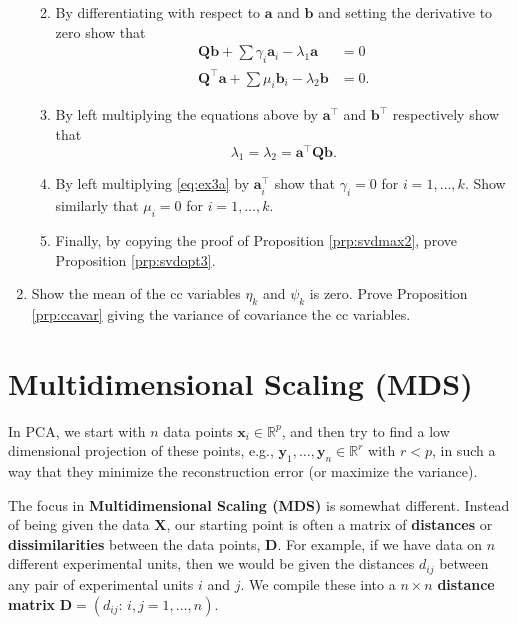 \documentclass[]{book}
\theoremstyle{definition}
\theoremstyle{definition}
\theoremstyle{definition}
\theoremstyle{remark}
\begin{document}
\begin{enumerate}
  \begin{enumerate}
  \def\labelenumii{\roman{enumii}.}
  \item
    By differentiating with respect to \(\mathbf a\) and \(\mathbf b\) and setting the derivative to zero show that
    \begin{align}
     \mathbf Q\mathbf b+ \sum\gamma_i \mathbf a_i - \lambda_1 \mathbf a&= 0 \label{eq:ex3a}\\
     \mathbf Q^\top\mathbf a+ \sum\mu_i \mathbf b_i - \lambda_2 \mathbf b&= 0. \label{eq:ex3b} 
     \end{align}
  \item
    By left multiplying the equations above by \(\mathbf a^\top\) and \(\mathbf b^\top\) respectively show that
    \[\lambda_1=\lambda_2 = \mathbf a^\top \mathbf Q\mathbf b.\]
  \item
    By left multiplying \eqref{eq:ex3a} by \(\mathbf a_i^\top\) show that \(\gamma_i=0\) for \(i=1, \ldots, k\). Show similarly that \(\mu_i =0\) for \(i=1, \ldots, k\).
  \item
    Finally, by copying the proof of Proposition \ref{prp:svdmax2}, prove Proposition \ref{prp:svdopt3}.
  \end{enumerate}
\item
  Show the mean of the cc variables \(\eta_k\) and \(\psi_k\) is zero. Prove Proposition \ref{prp:ccavar} giving the variance of covariance the cc variables.
\end{enumerate}

\hypertarget{mds}{%
\chapter{Multidimensional Scaling (MDS)}\label{mds}}

In PCA, we start with \(n\) data points \(\mathbf x_i \in \mathbb{R}^p\), and then try to find a low dimensional projection of these points, e.g., \(\mathbf y_1, \ldots, \mathbf y_n \in \mathbb{R}^r\) with \(r<p\), in such a way that they minimize the reconstruction error (or maximize the variance).

The focus in \textbf{Multidimensional Scaling (MDS)} is somewhat different. Instead of being given the data \(\mathbf X\), our starting point is often a matrix of \textbf{distances} or \textbf{dissimilarities} between the data points, \(\mathbf D\). For example, if we have data on \(n\) different experimental units, then we would be given the distances \(d_{ij}\) between any pair of experimental units \(i\) and \(j\). We compile these into a \(n\times n\) \textbf{distance matrix} \(\mathbf D=(d_{ij}: \, i,j=1, \ldots , n)\).
\end{document}
